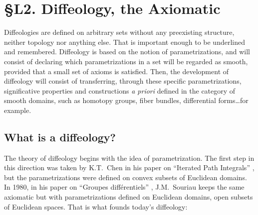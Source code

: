 
\chapter*{\S L2. Diffeology, the Axiomatic}
\setcounter{footnote}{0}

\begin{abstract}
  In this lecture we will look at the short axiomatic that founds diffeology.
  It describes the basic set-theoretic constructions of the theory and gives a few examples.
\end{abstract}


Diffeologies are defined on arbitrary sets without any preexisting structure,
neither topology nor anything else.
That is important enough to be underlined and remembered.
Diffeology is based on the notion of parametrizations,
and will consist of declaring which parametrizations in a set will be regarded as smooth,
provided that a small set of axioms is satisfied.
Then,
the development of diffeology will consist of transferring,
through these specific parametrizations,
significative properties and constructions \emph{a priori} defined in the category of smooth domains,
such as homotopy groups,
fiber bundles,
differential forms\dots for example.


\section{What is a diffeology?}

The theory of diffeology begins with the idea of parametrization.
The first step in this direction was taken by K.T.~Chen in his paper on ``Iterated Path Integrals'' \cite{Che77},
but the parametrizations were defined on convex subsets of Euclidean domains.
In 1980,
in his paper on ``Groupes diff\'erentiels'' \cite{Sou80},
J.M.~Souriau keeps the same axiomatic but with parametrizations defined on Euclidean domains,
open subsets of Euclidean spaces.
That is what founds today's diffeology:

